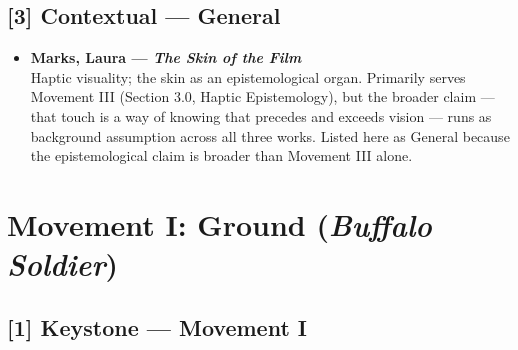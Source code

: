 \subsection*{[3] Contextual — General}

\begin{itemize}

    \item \textbf{Marks, Laura — \textit{The Skin of the Film}} \parencite{Marks_2000}\\
    Haptic visuality; the skin as an epistemological organ. Primarily serves Movement III (Section 3.0, Haptic Epistemology), but the broader claim — that touch is a way of knowing that precedes and exceeds vision — runs as background assumption across all three works. Listed here as General because the epistemological claim is broader than Movement III alone.

\end{itemize}

\bigskip


\section*{Movement I: Ground (\textit{Buffalo Soldier})}

\subsection*{[1] Keystone — Movement I}

